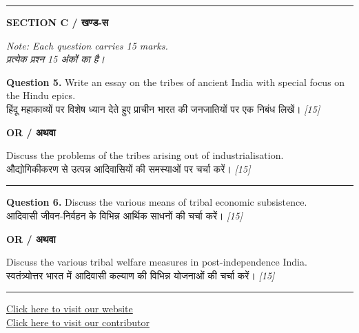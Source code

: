 \documentclass[11pt,a4paper]{article}
\newcommand{\pts}[1]{\hfill \textit{[#1]}}
\begin{document}
\bigskip
\rule{\linewidth}{0.2pt}
\bigskip

\begin{center}
  {\large\bfseries SECTION C / खण्ड-स}
\end{center}

\noindent \textit{Note: Each question carries 15 marks.}\\[2pt]
\noindent \textit{प्रत्येक प्रश्न 15 अंकों का है।}

\bigskip

\noindent \textbf{Question 5.} Write an essay on the tribes of ancient India with special focus on the Hindu epics.\\[1pt]
हिंदू महाकाव्यों पर विशेष ध्यान देते हुए प्राचीन भारत की जनजातियों पर एक निबंध लिखें। \pts{15}

\begin{center}
  \textbf{OR / अथवा}
\end{center}

\noindent Discuss the problems of the tribes arising out of industrialisation.\\[1pt]
औद्योगिकीकरण से उत्पन्न आदिवासियों की समस्याओं पर चर्चा करें। \pts{15}

\medskip\rule{\linewidth}{0.2pt}\medskip

\noindent \textbf{Question 6.} Discuss the various means of tribal economic subsistence.\\[1pt]
आदिवासी जीवन-निर्वहन के विभिन्न आर्थिक साधनों की चर्चा करें। \pts{15}

\begin{center}
  \textbf{OR / अथवा}
\end{center}

\noindent Discuss the various tribal welfare measures in post-independence India.\\[1pt]
स्वतंत्र्योत्तर भारत में आदिवासी कल्याण की विभिन्न योजनाओं की चर्चा करें। \pts{15}

\vfill
\rule{\linewidth}{0.4pt}

\begin{center}\small
\href{https://bhu-exam.vercel.app/}{Click here to visit our website}\\[4pt]
\href{https://me-aryan.vercel.app/}{Click here to visit our contributor}
\end{center}
\end{document}

